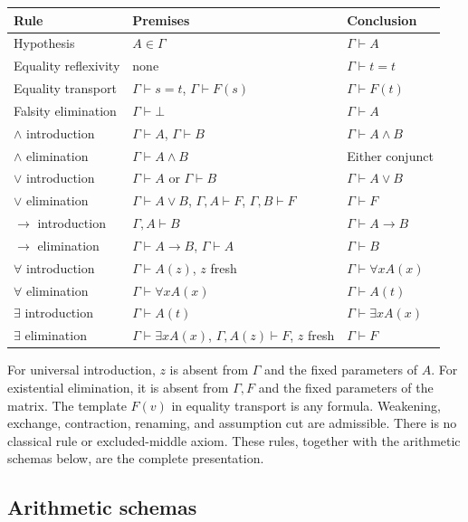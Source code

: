 \documentclass[11pt,letterpaper]{article}
\theoremstyle{definition}\newtheorem{definition}[theorem]{Definition}
\theoremstyle{remark}\newtheorem{remark}[theorem]{Remark}
\begin{document}
\begin{center}\small
\begin{tabularx}{\linewidth}{@{}lXX@{}}
\toprule
Rule & Premises & Conclusion\\
\midrule
Hypothesis & $A\in\Gamma$ & $\Gamma\vdash A$\\
Equality reflexivity & none & $\Gamma\vdash t=t$\\
Equality transport & $\Gamma\vdash s=t$, $\Gamma\vdash F(s)$ & $\Gamma\vdash F(t)$\\
Falsity elimination & $\Gamma\vdash\bot$ & $\Gamma\vdash A$\\
$\land$ introduction & $\Gamma\vdash A$, $\Gamma\vdash B$ & $\Gamma\vdash A\land B$\\
$\land$ elimination & $\Gamma\vdash A\land B$ & Either conjunct\\
$\lor$ introduction & $\Gamma\vdash A$ or $\Gamma\vdash B$ & $\Gamma\vdash A\lor B$\\
$\lor$ elimination & $\Gamma\vdash A\lor B$, $\Gamma,A\vdash F$, $\Gamma,B\vdash F$ & $\Gamma\vdash F$\\
$\to$ introduction & $\Gamma,A\vdash B$ & $\Gamma\vdash A\to B$\\
$\to$ elimination & $\Gamma\vdash A\to B$, $\Gamma\vdash A$ & $\Gamma\vdash B$\\
$\forall$ introduction & $\Gamma\vdash A(z)$, $z$ fresh & $\Gamma\vdash\forall x A(x)$\\
$\forall$ elimination & $\Gamma\vdash\forall x A(x)$ & $\Gamma\vdash A(t)$\\
$\exists$ introduction & $\Gamma\vdash A(t)$ & $\Gamma\vdash\exists x A(x)$\\
$\exists$ elimination & $\Gamma\vdash\exists x A(x)$, $\Gamma,A(z)\vdash F$, $z$ fresh & $\Gamma\vdash F$\\
\bottomrule
\end{tabularx}
\end{center}

For universal introduction, $z$ is absent from $\Gamma$ and the fixed
parameters of $A$. For existential elimination, it is absent from
$\Gamma,F$ and the fixed parameters of the matrix. The template $F(v)$
in equality transport is any formula. Weakening, exchange, contraction,
renaming, and assumption cut are admissible. There is no classical rule
or excluded-middle axiom. These rules, together with the arithmetic
schemas below, are the complete presentation.

\subsection{Arithmetic schemas}
\end{document}
